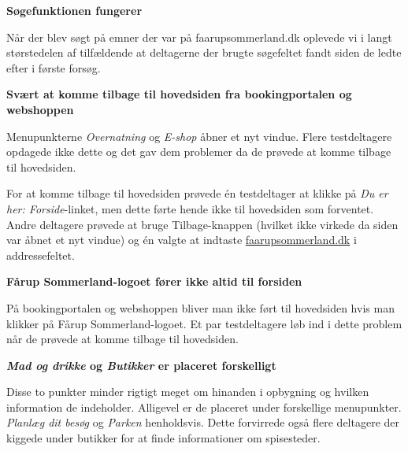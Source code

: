 \documentclass[10pt,a4paper]{article}      %
\newcommand\pic[1]{\texttt{[image: Pics/\#1]}}
\renewcommand\good{\pic{good}}
\renewcommand\smallproblem{\pic{smallproblem}}
\begin{document}
\begin{kommentarer}
\item[\good]{\textbf{Søgefunktionen fungerer}}

Når der blev søgt på emner der var på faarupsommerland.dk oplevede vi i langt størstedelen af tilfældende at deltagerne der brugte søgefeltet fandt siden de ledte efter i første forsøg.

\item[\smallproblem]{\textbf{Svært at komme tilbage til hovedsiden fra bookingportalen og webshoppen}}

Menupunkterne \emph{Overnatning} og \emph{E-shop} åbner et nyt vindue. Flere testdeltagere
opdagede ikke dette og det gav dem problemer da de prøvede at komme tilbage til hovedsiden.

For at komme tilbage til hovedsiden prøvede én testdeltager at klikke på \emph{Du er her:
Forside}-linket, men dette førte hende ikke til hovedsiden som forventet. Andre deltagere
prøvede at bruge Tilbage-knappen (hvilket ikke virkede da siden var åbnet et nyt vindue)
og én valgte at indtaste \url{faarupsommerland.dk} i addressefeltet.

\item[\smallproblem]{\textbf{Fårup Sommerland-logoet fører ikke altid til forsiden}}

På bookingportalen og webshoppen bliver man ikke ført til hovedsiden hvis man klikker på Fårup
Sommerland-logoet. Et par testdeltagere løb ind i dette problem når de prøvede at komme
tilbage til hovedsiden.

\item[\smallproblem] \textbf{\emph{Mad og drikke} og \emph{Butikker} er placeret forskelligt}

Disse to punkter minder rigtigt meget om hinanden i opbygning og hvilken information de indeholder. Alligevel er de placeret under forskellige menupunkter. \emph{Planlæg dit besøg} og \emph{Parken} henholdsvis. Dette forvirrede også flere deltagere der kiggede under butikker for at finde informationer om spisesteder.

\end{kommentarer}
\end{document}
